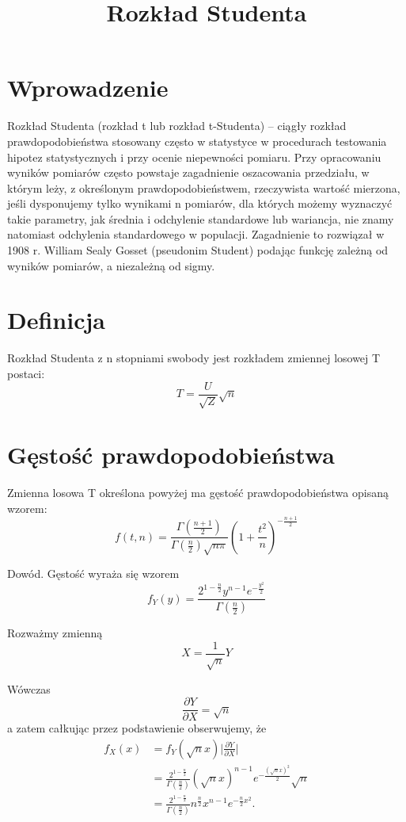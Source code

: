 \documentclass{article}
\begin{document}
\title{Rozkład Studenta}
\maketitle

\section*{Wprowadzenie}
Rozkład Studenta (rozkład t lub rozkład t-Studenta) – ciągły rozkład prawdopodobieństwa stosowany często w statystyce w procedurach testowania hipotez statystycznych i przy ocenie niepewności pomiaru. Przy opracowaniu wyników pomiarów często powstaje zagadnienie oszacowania przedziału, w którym leży, z określonym prawdopodobieństwem, rzeczywista wartość mierzona, jeśli dysponujemy tylko wynikami n pomiarów, dla których możemy wyznaczyć takie parametry, jak średnia i odchylenie standardowe lub wariancja, nie znamy natomiast odchylenia standardowego w populacji. Zagadnienie to rozwiązał w 1908 r. William Sealy Gosset (pseudonim Student) podając funkcję zależną od wyników pomiarów, a niezależną od sigmy.

\section*{Definicja}
Rozkład Studenta z n stopniami swobody jest rozkładem zmiennej losowej T postaci: 
\[ T={\frac {U}{\sqrt {Z}}}{\sqrt {n}} \]

\section*{Gęstość prawdopodobieństwa}
Zmienna losowa T określona powyżej ma gęstość prawdopodobieństwa opisaną wzorem: 
$$ f(t,n)={\frac {\Gamma ({\frac {n+1}{2}})}{\Gamma ({\frac {n}{2}}){\sqrt {n\pi }}}}\left(1+{\frac {t^{2}}{n}}\right)^{-{\frac {n+1}{2}}} $$

Dowód. Gęstość wyraża się wzorem
\[ f_{Y}(y)={\frac {2^{1-{\frac {n}{2}}}y^{n-1}e^{-{\frac {y^{2}}{2}}}}{\Gamma ({\frac {n}{2}})}} \]

Rozważmy zmienną
$$ X={\frac  {1}{{\sqrt  {n}}}}Y $$

Wówczas
$$ {\frac  {\partial Y}{\partial X}}={\sqrt  n} $$
a zatem całkując przez podstawienie obserwujemy, że 
\[ {\begin{aligned}f_{X}(x)&=f_{Y}({\sqrt {n}}x){\Big |}{\frac {\partial Y}{\partial X}}{\Big |}\\&={\frac {2^{1-{\frac {n}{2}}}}{\Gamma \left({\frac {n}{2}}\right)}}({\sqrt {n}}x)^{n-1}e^{-{\frac {({\sqrt {n}}x)^{2}}{2}}}{\sqrt {n}}\\&={\frac {2^{1-{\frac {n}{2}}}}{\Gamma \left({\frac {n}{2}}\right)}}n^{\frac {n}{2}}x^{n-1}e^{-{\frac {n}{2}}x^{2}}.\end{aligned}} \]
\end{document}
